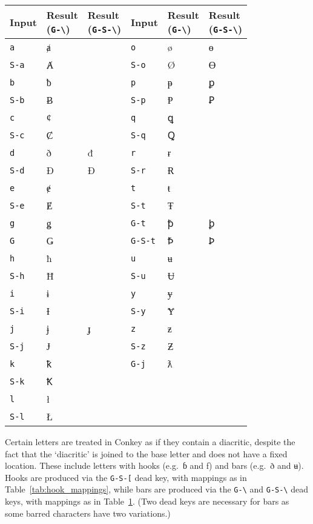 \documentclass[oneside]{memoir}
\newcommand{\key}{\verb}
\newcommand{\keynv}{\texttt}
\newcommand{\out}[1]{\colorbox{gray!20}{#1}}
\begin{document}
\begin{table}
\begin{minipage}{0.55\paperwidth}
\label{tab:bar_mappings}
\begin{tabular}{lll@{\hspace{1cm}}lll}
\toprule
Input
 & \makecell{Result\\(\keynv{G-\textbackslash})}
 & \makecell{Result\\(\keynv{G-S-\textbackslash})}
& Input
 & \makecell{Result\\(\keynv{G-\textbackslash})}
 & \makecell{Result\\(\keynv{G-S-\textbackslash})} \\
\midrule
\key|a|   & ⱥ &   & \key|o|     & ø & ɵ \\
\key|S-a| & Ⱥ &   & \key|S-o|   & Ø & Ɵ \\
\key|b|   & ƀ &   & \key|p|     & ᵽ & ꝑ \\
\key|S-b| & Ƀ &   & \key|S-p|   & Ᵽ & Ꝑ \\
\key|c|   & ȼ &   & \key|q|     & ꝗ &   \\
\key|S-c| & Ȼ &   & \key|S-q|   & Ꝗ &   \\
\key|d|   & ð & đ & \key|r|     & ɍ &   \\
\key|S-d| & Ð & Đ & \key|S-r|   & Ɍ &   \\
\key|e|   & ɇ &   & \key|t|     & ŧ &   \\
\key|S-e| & Ɇ &   & \key|S-t|   & Ŧ &   \\
\key|g|   & ǥ &   & \key|G-t|   & ꝥ & ꝧ \\
\key|G|   & Ǥ &   & \key|G-S-t| & Ꝥ & Ꝧ \\
\key|h|   & ħ &   & \key|u|     & ʉ & \\
\key|S-h| & Ħ &   & \key|S-u|   & Ʉ & \\
\key|i|   & ɨ &   & \key|y|     & ɏ & \\
\key|S-i| & Ɨ &   & \key|S-y|   & Ɏ & \\
\key|j|   & ɉ & ɟ & \key|z|     & ƶ & \\
\key|S-j| & Ɉ &   & \key|S-z|   & Ƶ & \\
\key|k|   & ꝁ &   & \key|G-j|   & ƛ & \\
\key|S-k| & Ꝁ &   &             &   & \\
\key|l|   & ł &   &             &   & \\
\key|S-l| & Ł &   &             &   & \\
\bottomrule
\end{tabular}
\end{minipage}
\end{table}

Certain letters are treated in Conkey as if they contain a diacritic,
  despite the fact that the `diacritic' is joined to the base letter and does not have a fixed location.
These include letters with hooks (e.g.\ \out{ɓ} and \out{ƒ}) and bars (e.g.\ \out{ð} and \out{ʉ}).
Hooks are produced via the \key|G-S-[| dead key, with mappings as in Table~\ref{tab:hook_mappings},
  while bars are produced via the \key|G-\| and \key|G-S-\| dead keys, with mappings as in Table~\ref{tab:bar_mappings}.
(Two dead keys are necessary for bars as some barred characters have two variations.)
\end{document}

